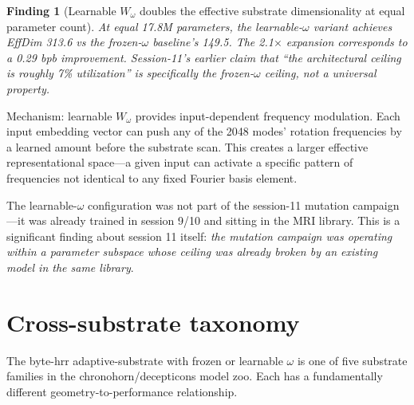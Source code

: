 \documentclass[11pt,openany]{book}
\newtheorem{finding}{Finding}[chapter]
\begin{document}
\begin{finding}[Learnable $W_\omega$ doubles the effective substrate
dimensionality at equal parameter count]
At equal 17.8M parameters, the learnable-$\omega$ variant achieves
EffDim 313.6 vs the frozen-$\omega$ baseline's 149.5. The 2.1$\times$
expansion corresponds to a 0.29 bpb improvement. Session-11's earlier
claim that ``the architectural ceiling is roughly 7\% utilization''
is specifically the \emph{frozen-$\omega$} ceiling, not a universal
property.
\end{finding}

Mechanism: learnable $W_\omega$ provides input-dependent frequency
modulation. Each input embedding vector can push any of the 2048
modes' rotation frequencies by a learned amount before the substrate
scan. This creates a larger effective representational space---a
given input can activate a specific pattern of frequencies not
identical to any fixed Fourier basis element.

The learnable-$\omega$ configuration was not part of the
session-11 mutation campaign---it was already trained in session 9/10
and sitting in the MRI library. This is a significant finding about
session 11 itself: \emph{the mutation campaign was operating within a
parameter subspace whose ceiling was already broken by an existing
model in the same library}.

\chapter{Cross-substrate taxonomy}
\label{chap:substrate-families}

The byte-hrr adaptive-substrate with frozen or learnable $\omega$ is
one of five substrate families in the chronohorn/decepticons model
zoo. Each has a fundamentally different geometry-to-performance
relationship.
\end{document}
